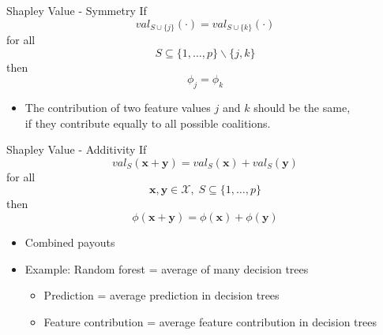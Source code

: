 \begin{frame}{Shapley Value - Symmetry}
	If
	\begin{equation}
		val_{S \cup \{j\}}(\cdot)=val_{S\cup\{k\}}(\cdot)
	\end{equation}
	for all
	\begin{equation*}
		S\subseteq\{1,\ldots, p\} \backslash \{j,k\}
	\end{equation*}
	then
	\begin{equation*}
		\phi_j=\phi_k
	\end{equation*}
	\begin{itemize}
		\item The contribution of two feature values $j$ and $k$ should be the same, 
		\\if they contribute equally to all possible coalitions.
	\end{itemize}
\end{frame}
\begin{frame}{Shapley Value - Additivity}
	If
	\begin{equation}
		val_S(\bm{x} + \bm{y}) = val_S(\bm{x}) + val_S(\bm{y})
	\end{equation}
	for all
	\begin{equation*}
		\bm{x}, \bm{y} \in \mathcal{X},\; S\subseteq\{1,\ldots, p\}
	\end{equation*}
	then
	\begin{equation*}
		\phi(\bm{x} + \bm{y})=\phi(\bm{x}) + \phi(\bm{y})
	\end{equation*}
	\begin{itemize}
		\item Combined payouts
		\item Example: Random forest = average of many decision trees
		\begin{itemize}
			\item Prediction = average prediction in decision trees
			\item Feature contribution = average feature contribution in decision trees
		\end{itemize}
	\end{itemize}
\end{frame}